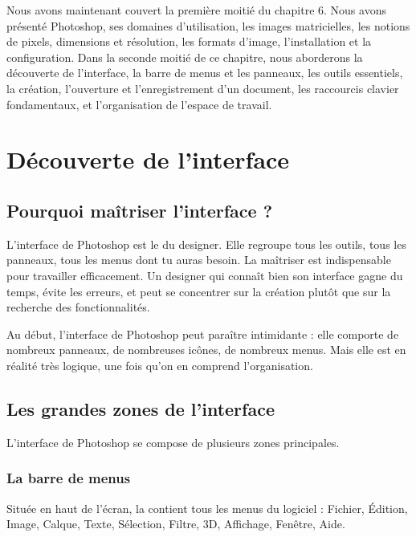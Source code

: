 Nous avons maintenant couvert la première moitié du chapitre 6. Nous avons présenté Photoshop, ses domaines d'utilisation, les images matricielles, les notions de pixels, dimensions et résolution, les formats d'image, l'installation et la configuration. Dans la seconde moitié de ce chapitre, nous aborderons la découverte de l'interface, la barre de menus et les panneaux, les outils essentiels, la création, l'ouverture et l'enregistrement d'un document, les raccourcis clavier fondamentaux, et l'organisation de l'espace de travail.

\section{Découverte de l'interface}

\subsection{Pourquoi maîtriser l'interface ?}

L'interface de Photoshop est le  du designer. Elle regroupe tous les outils, tous les panneaux, tous les menus dont tu auras besoin. La maîtriser est indispensable pour travailler efficacement. Un designer qui connaît bien son interface gagne du temps, évite les erreurs, et peut se concentrer sur la création plutôt que sur la recherche des fonctionnalités.

Au début, l'interface de Photoshop peut paraître intimidante : elle comporte de nombreux panneaux, de nombreuses icônes, de nombreux menus. Mais elle est en réalité très logique, une fois qu'on en comprend l'organisation.

\subsection{Les grandes zones de l'interface}

L'interface de Photoshop se compose de plusieurs zones principales.

\subsubsection{La barre de menus}

Située en haut de l'écran, la  contient tous les menus du logiciel : Fichier, Édition, Image, Calque, Texte, Sélection, Filtre, 3D, Affichage, Fenêtre, Aide.

